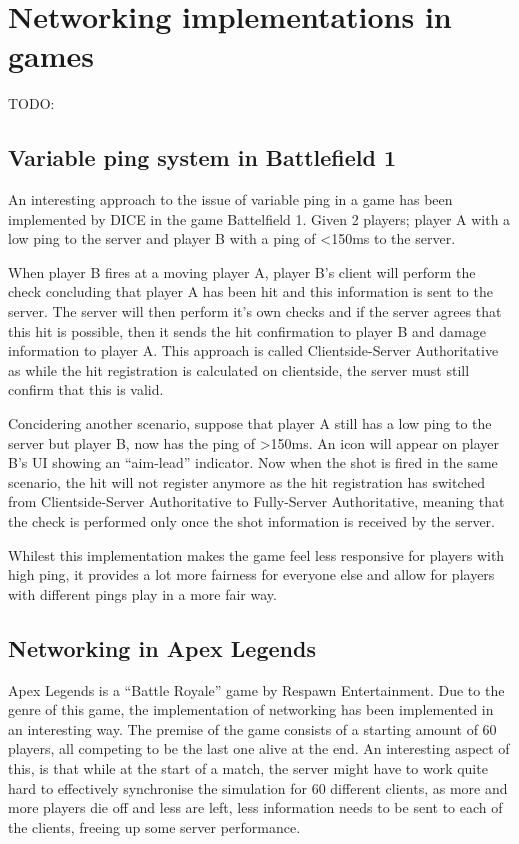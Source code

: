 \section{Networking implementations in games}
TODO:

\subsection{Variable ping system in Battlefield 1}
An interesting approach to the issue of variable ping in a game has been implemented by DICE in the game Battelfield 1. Given 2 players; player A with a low ping to the server and player B with a ping of <150ms to the server.

When player B fires at a moving player A, player B's client will perform the check concluding that player A has been hit and this information is sent to the server. The server will then perform it's own checks and if the server agrees that this hit is possible, then it sends the hit confirmation to player B and damage information to player A. This approach is called Clientside-Server Authoritative as while the hit registration is calculated on clientside, the server must still confirm that this is valid.

Concidering another scenario, suppose that player A still has a low ping to the server but player B, now has the ping of >150ms. An icon will appear on player B's UI showing an ``aim-lead'' indicator. Now when the shot is fired in the same scenario, the hit will not register anymore as the hit registration has switched from Clientside-Server Authoritative to Fully-Server Authoritative, meaning that the check is performed only once the shot information is received by the server.

Whilest this implementation makes the game feel less responsive for players with high ping, it provides a lot more fairness for everyone else and allow for players with different pings play in a more fair way.


\subsection{Networking in Apex Legends}
Apex Legends is a ``Battle Royale'' game by Respawn Entertainment. Due to the genre of this game, the implementation of networking has been implemented in an interesting way. The premise of the game consists of a starting amount of 60 players, all competing to be the last one alive at the end. An interesting aspect of this, is that while at the start of a match, the server might have to work quite hard to effectively synchronise the simulation for 60 different clients, as more and more players die off and less are left, less information needs to be sent to each of the clients, freeing up some server performance.

